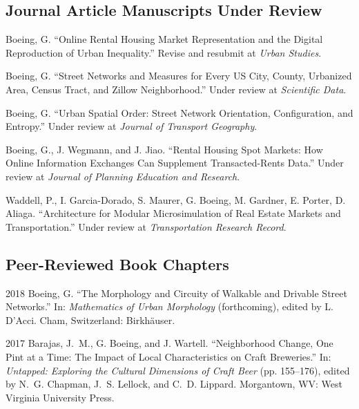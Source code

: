 \documentclass[12pt,letterpaper]{report}
\begin{document}
	
	
	\subsection*{Journal Article Manuscripts Under Review}
	
	\begin{tablist}
		
		\item[\the\year] \tab Boeing, G. \enquote{Online Rental Housing Market Representation and the Digital Reproduction of Urban Inequality.} Revise and resubmit at \textit{Urban Studies}.
		
		\item[\the\year] \tab Boeing, G. \enquote{Street Networks and Measures for Every US City, County, Urbanized Area, Census Tract, and Zillow Neighborhood.} Under review at \textit{Scientific Data}.
		
		\item[\the\year] \tab Boeing, G. \enquote{Urban Spatial Order: Street Network Orientation, Configuration, and Entropy.} Under review at \textit{Journal of Transport Geography}.
		
		\item[\the\year] \tab Boeing, G., J. Wegmann, and J. Jiao. \enquote{Rental Housing Spot Markets: How Online Information Exchanges Can Supplement Transacted-Rents Data.} Under review at \textit{Journal of Planning Education and Research}.
		
		\item[\the\year] \tab Waddell, P., I. Garcia-Dorado, S. Maurer, G. Boeing, M. Gardner, E. Porter, D. Aliaga. \enquote{Architecture for Modular Microsimulation of Real Estate Markets and Transportation.} Under review at \textit{Transportation Research Record}.
		
	\end{tablist}
	
	
	
	\subsection*{Peer-Reviewed Book Chapters}
	
	\begin{tablist}
		
		\item[2018] \tab Boeing, G. \enquote{The Morphology and Circuity of Walkable and Drivable Street Networks.} In: \textit{Mathematics of Urban Morphology} (forthcoming), edited by L. D'Acci. Cham, Switzerland: Birkhäuser.
		
		\item[2017] \tab Barajas, J.~M., G. Boeing, and J. Wartell. \enquote{Neighborhood Change, One Pint at a Time: The Impact of Local Characteristics on Craft Breweries.} In: \textit{Untapped: Exploring the Cultural Dimensions of Craft Beer} (pp. 155--176), edited by N.~G. Chapman, J.~S. Lellock, and C.~D. Lippard. Morgantown, WV: West Virginia University Press.
		
	\end{tablist}
	
\end{document}
